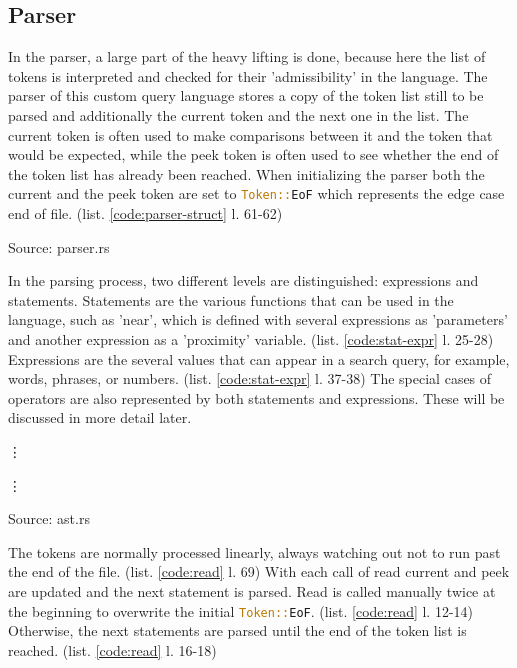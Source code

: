 \subsection{Parser}
In the parser, a large part of the heavy lifting is done, because here the list of tokens is interpreted and checked for their 'admissibility' in the language. The parser of this custom query language stores a copy of the token list still to be parsed and additionally the current token and the next one in the list. The current token is often used to make comparisons between it and the token that would be expected, while the peek token is often used to see whether the end of the token list has already been reached. When initializing the parser both the current and the peek token are set to \lstinline[language=Rust]$Token::EoF$ which represents the edge case end of file. (list. \ref{code:parser-struct} l. 61-62)
\begin{codeenv}
    \label{code:parser-struct}
    
    \centerline{Source: parser.rs}
\end{codeenv}
In the parsing process, two different levels are distinguished: expressions and statements. Statements are the various functions that can be used in the language, such as 'near', which is defined with several expressions as 'parameters' and another expression as a 'proximity' variable. (list. \ref{code:stat-expr} l. 25-28) Expressions are the several values that can appear in a search query, for example, words, phrases, or numbers. (list. \ref{code:stat-expr} l. 37-38) The special cases of operators are also represented by both statements and expressions. These will be discussed in more detail later.
\begin{codeenv}
    \label{code:stat-expr}
    
    \vdots
    
    \vdots
    
    \centerline{Source: ast.rs}
\end{codeenv}
The tokens are normally processed linearly, always watching out not to run past the end of the file. (list. \ref{code:read} l. 69) With each call of read current and peek are updated and the next statement is parsed. Read is called manually twice at the beginning to overwrite the initial \lstinline[language=Rust]$Token::EoF$. (list. \ref{code:read} l. 12-14) Otherwise, the next statements are parsed until the end of the token list is reached. (list. \ref{code:read} l. 16-18)
